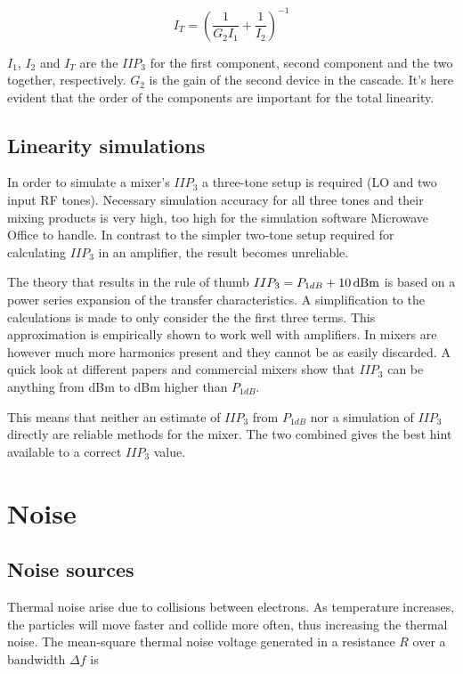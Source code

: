 			\begin{equation}\label{eq:casciip3}
				I_T=\left ( \frac{1}{G_2I_1} + \frac{1}{I_2} \right )^{-1}
			\end{equation}

			$I_1$, $I_2$ and $I_T$ are the $IIP_3$ for the first component, second component and the two together, respectively. $G_2$ is the gain of the second device in the cascade. It's here evident that the order of the components are important for the total linearity.

		\subsection{Linearity simulations}
			In order to simulate a mixer's $IIP_3$ a three-tone setup is required (LO and two input RF tones). Necessary simulation accuracy for all three tones and their mixing products is very high, too high for the simulation software Microwave Office to handle. In contrast to the simpler two-tone setup required for calculating $IIP_3$ in an amplifier, the result becomes unreliable.
			
			The theory that results in the rule of thumb $IIP_3=P_{1dB}+\unit[10]{dBm}$ is based on a power series expansion of the transfer characteristics. A simplification to the calculations is made to only consider the the first three terms. This approximation is empirically shown to work well with amplifiers. In mixers are however much more harmonics present and they cannot be as easily discarded. A quick look at different papers and commercial mixers show that $IIP_3$ can be anything from \unit[6]{dBm} to \unit[14]{dBm} higher than $P_{1dB}$.
			
			This means that neither an estimate of $IIP_3$ from $P_{1dB}$ nor a simulation of $IIP_3$ directly are reliable methods for the mixer. The two combined gives the best hint available to a correct $IIP_3$ value.

	\section{Noise}
		\subsection{Noise sources}\label{sec:noise_thermal}
			Thermal noise arise due to collisions between electrons. As temperature increases, the particles will move faster and collide more often, thus increasing the thermal noise. The mean-square thermal noise voltage generated in a resistance $R$ over a bandwidth $\Delta f$ is\autocite{bahl03}
			
